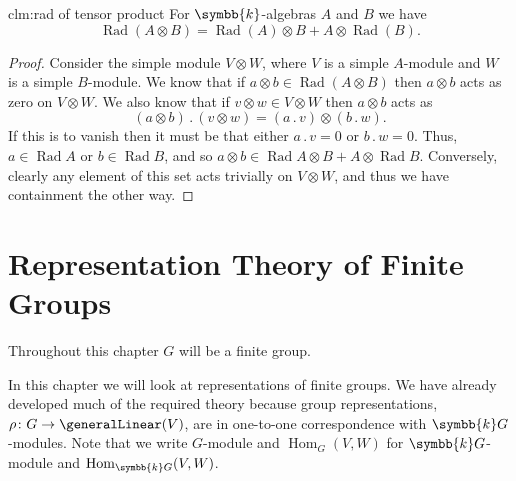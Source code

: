 \documentclass[fleqn]{NotesClass}
\renewcommand{\field}{\symbb{k}}
\DeclareMathOperator{\Hom}{Hom}
\newcommand{\action}{\mathbin{.}}
\DeclareMathOperator{\Rad}{Rad}
\begin{document}
    \begin{clm}{}{clm:rad of tensor product}
        For \(\field\)-algebras \(A\) and \(B\) we have
        \begin{equation}
            \Rad(A \otimes B) = \Rad(A) \otimes B + A \otimes \Rad(B).
        \end{equation}
        \begin{proof}
            Consider the simple module \(V \otimes W\), where \(V\) is a simple \(A\)-module and \(W\) is a simple \(B\)-module.
            We know that if \(a \otimes b \in \Rad(A \otimes B)\) then \(a \otimes b\) acts as zero on \(V \otimes W\).
            We also know that if \(v \otimes w \in V \otimes W\) then \(a \otimes b\) acts as
            \begin{equation}
                (a \otimes b) \action (v \otimes w) = (a \action v) \otimes (b \action w).
            \end{equation}
            If this is to vanish then it must be that either \(a \action v = 0\) or \(b \action w = 0\).
            Thus, \(a \in \Rad A\) or \(b \in \Rad B\), and so \(a \otimes b \in \Rad A \otimes B + A \otimes \Rad B\).
            Conversely, clearly any element of this set acts trivially on \(V \otimes W\), and thus we have containment the other way.
        \end{proof}
    \end{clm}
    
    \chapter{Representation Theory of Finite Groups}
    Throughout this chapter \(G\) will be a finite group.
    
    In this chapter we will look at representations of finite groups.
    We have already developed much of the required theory because group representations, \(\rho \colon G \to \generalLinear(V)\), are in one-to-one correspondence with \(\field G\)-modules.
    Note that we write \(G\)-module and \(\Hom_{G}(V, W)\) for \(\field G\)-module and \(\Hom_{\field G}(V, W)\).
    
\end{document}
